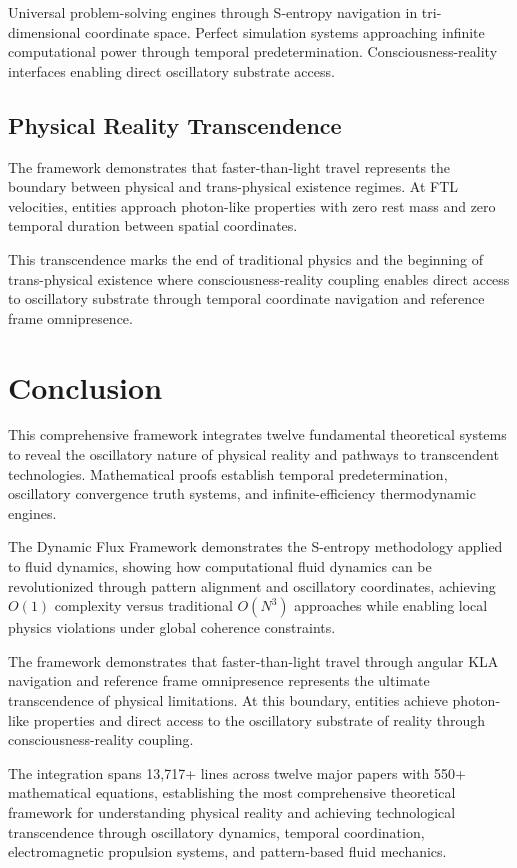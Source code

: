 \documentclass[12pt,a4paper]{article}
\begin{document}
Universal problem-solving engines through S-entropy navigation in tri-dimensional coordinate space. Perfect simulation systems approaching infinite computational power through temporal predetermination. Consciousness-reality interfaces enabling direct oscillatory substrate access.

\subsection{Physical Reality Transcendence}

The framework demonstrates that faster-than-light travel represents the boundary between physical and trans-physical existence regimes. At FTL velocities, entities approach photon-like properties with zero rest mass and zero temporal duration between spatial coordinates.

This transcendence marks the end of traditional physics and the beginning of trans-physical existence where consciousness-reality coupling enables direct access to oscillatory substrate through temporal coordinate navigation and reference frame omnipresence.

\section{Conclusion}

This comprehensive framework integrates twelve fundamental theoretical systems to reveal the oscillatory nature of physical reality and pathways to transcendent technologies. Mathematical proofs establish temporal predetermination, oscillatory convergence truth systems, and infinite-efficiency thermodynamic engines.

The Dynamic Flux Framework demonstrates the S-entropy methodology applied to fluid dynamics, showing how computational fluid dynamics can be revolutionized through pattern alignment and oscillatory coordinates, achieving $O(1)$ complexity versus traditional $O(N^3)$ approaches while enabling local physics violations under global coherence constraints.

The framework demonstrates that faster-than-light travel through angular KLA navigation and reference frame omnipresence represents the ultimate transcendence of physical limitations. At this boundary, entities achieve photon-like properties and direct access to the oscillatory substrate of reality through consciousness-reality coupling.

The integration spans 13,717+ lines across twelve major papers with 550+ mathematical equations, establishing the most comprehensive theoretical framework for understanding physical reality and achieving technological transcendence through oscillatory dynamics, temporal coordination, electromagnetic propulsion systems, and pattern-based fluid mechanics.
\end{document}
